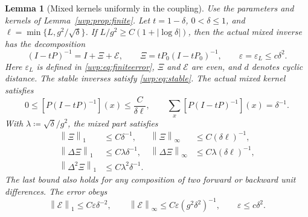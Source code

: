 \documentclass[11pt]{article}
\numberwithin{equation}{section}
\newtheorem{lemma}[theorem]{Lemma}
\theoremstyle{remark}
\newcommand{\norm}[1]{\left\|#1\right\|}
\begin{document}
\begin{lemma}[Mixed kernels uniformly in the coupling]\label{uvp:lem:actual-kernels}
Use the parameters and kernels of Lemma~\ref{uvp:prop:finite}.
Let $t=1-\delta$, $0<\delta\le1$, and
$\ell=\min\{L,g^2/\sqrt\delta\}$. If
$L/g^2\ge C(1+|\log\delta|)$, then the actual mixed inverse has the
decomposition
\begin{equation}\label{da:eq:actual-kernel-decomposition}
 (I-tP)^{-1}=I+\Xi+\mathcal E,\qquad
 \Xi=tP_0(I-tP_0)^{-1},\qquad \varepsilon=\varepsilon_L\le c\delta^2.
\end{equation}
Here $\varepsilon_L$ is defined in \eqref{uvp:eq:finiteerror},
$\Xi$ and $\mathcal E$ are even, and $d$ denotes cyclic distance.
The stable inverses satisfy \eqref{uvp:eq:stable}.
The actual mixed kernel satisfies
\begin{equation}\label{da:eq:uniform-mixed-row}
 0\le[P(I-tP)^{-1}](x)\le\frac{C}{\delta\ell},\qquad
 \sum_x[P(I-tP)^{-1}](x)=\delta^{-1}.
\end{equation}
With $\lambda\coloneqq\sqrt\delta/g^2$, the mixed part satisfies
\begin{align}
 \norm{\Xi}_1&\le C\delta^{-1},&
 \norm{\Xi}_\infty&\le C(\delta\ell)^{-1},\label{uvp:eq:xi}\\
 \norm{\Delta\Xi}_1&\le C\lambda\delta^{-1},&
 \norm{\Delta\Xi}_\infty&\le C\lambda(\delta\ell)^{-1},\label{uvp:eq:xi1}\\
 \norm{\Delta^2\Xi}_1&\le C\lambda^2\delta^{-1}.&&\label{uvp:eq:xi2}
\end{align}
The last bound also holds for any composition of two forward or
backward unit differences.
The error obeys
\begin{equation}\label{uvp:eq:error}
 \norm{\mathcal E}_1\le C\varepsilon\delta^{-2},\qquad
 \norm{\mathcal E}_\infty\le C\varepsilon(g^2\delta^2)^{-1},\qquad
 \varepsilon\le c\delta^2.
\end{equation}



\end{lemma}
\end{document}

